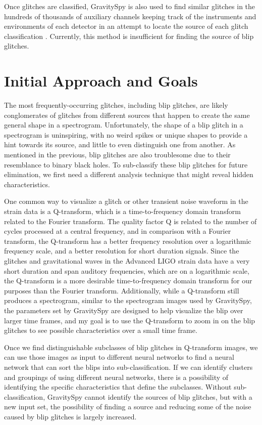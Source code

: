\documentclass[a4paper]{article}
\begin{document}
Once glitches are classified, GravitySpy is also used to find similar glitches in the hundreds of thousands of auxiliary channels keeping track of the instruments and environments of each detector in an attempt to locate the source of each glitch classification \cite{Zevin:2016}. Currently, this method is insufficient for finding the source of blip glitches.

\section{Initial Approach and Goals} \label{goal}

The most frequently-occurring glitches, including blip glitches, are likely conglomerates of glitches from different sources that happen to create the same general shape in a spectrogram. Unfortunately, the shape of a blip glitch in a spectrogram is uninspiring, with no weird spikes or unique shapes to provide a hint towards its source, and little to even distinguish one from another. As mentioned in the previous, blip glitches are also troublesome due to their resemblance to binary black holes. To sub-classify these blip glitches for future elimination, we first need a different analysis technique that might reveal hidden characteristics. 

One common way to visualize a glitch or other transient noise waveform in the strain data is a Q-transform, which is a time-to-frequency domain transform related to the Fourier transform. The quality factor Q is related to the number of cycles processed at a central frequency, and in comparison with a Fourier transform, the Q-transform has a better frequency resolution over a logarithmic frequency scale, and a better resolution for short duration signals. Since the glitches and gravitational waves in the Advanced LIGO strain data have a very short duration and span auditory frequencies, which are on a logarithmic scale, the Q-transform is a more desirable time-to-frequency domain transform for our purposes than the Fourier transform. Additionally, while a Q-transform still produces a spectrogram, similar to the spectrogram images used by GravitySpy, the parameters set by GravitySpy are designed to help visualize the blip over larger time frames, and my goal is to use the Q-transform to zoom in on the blip glitches to see possible characteristics over a small time frame.

Once we find distinguishable subclasses of blip glitches in Q-transform images, we can use those images as input to different neural networks to find a neural network that can sort the blips into sub-classification. If we can identify clusters and groupings of using different neural networks, there is a possibility of identifying the specific characteristics that define the subclasses. Without sub-classification, GravitySpy cannot identify the sources of blip glitches, but with a new input set, the possibility of finding a source and reducing some of the noise caused by blip glitches is largely increased. 
\end{document}
